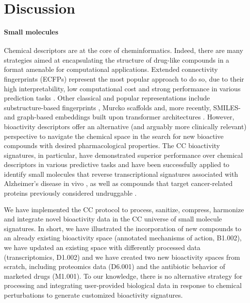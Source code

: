 \chapter{Discussion}
\label{discussion}
\clearpage


\subsubsection{Small molecules}


Chemical descriptors are at the core of cheminformatics. Indeed, there are many strategies aimed at encapsulating the structure of drug-like compounds in a format amenable for computational applications. Extended connectivity fingerprints (ECFPs) represent the most popular approach to do so, due to their high interpretability, low computational cost and strong performance in various prediction tasks \cite{rogers_extended-connectivity_2010}. Other classical and popular representations include substructure-based fingerprints \cite{durant_reoptimization_2002}, Murcko scaffolds \cite{bemis_properties_1996} and, more recently, SMILES- and graph-based embeddings built upon transformer architectures \cite{shin_self-attention_2019, zhou_uni-mol_2022}. However, bioactivity descriptors offer an alternative (and arguably more clinically relevant) perspective to navigate the chemical space in the search for new bioactive compounds with desired pharmacological properties. The CC bioactivity signatures, in particular, have demonstrated superior performance over chemical descriptors in various predictive tasks and have been successfully applied to identify small molecules that reverse transcriptional signatures associated with Alzheimer’s disease in vivo \cite{pauls_identification_2021}, as well as compounds that target cancer-related proteins previously considered undruggable \cite{bertoni_bioactivity_2021}.

We have implemented the CC protocol to process, sanitize, compress, harmonize and integrate novel bioactivity data in the CC universe of small molecule signatures. In short, we have illustrated the incorporation of new compounds to an already existing bioactivity space (annotated mechanisms of action, B1.002), we have updated an existing space with differently processed data (transcriptomics, D1.002) and we have created two new bioactivity spaces from scratch, including proteomics data (D6.001) and the antibiotic behavior of marketed drugs (M1.001). To our knowledge, there is no alternative strategy for processing and integrating user-provided biological data in response to chemical perturbations to generate customized bioactivity signatures. 


